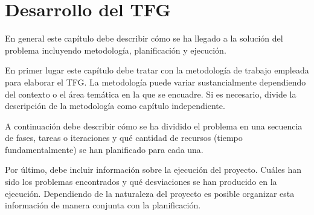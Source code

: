 \chapter{Desarrollo del TFG}
\label{ch:desarrollo}

En general este capítulo debe describir cómo se ha llegado a la solución del problema incluyendo metodología, planificación y ejecución.

En primer lugar este capítulo debe tratar con la metodología de trabajo empleada para elaborar el TFG.  La metodología puede variar sustancialmente dependiendo del contexto o el área temática en la que se encuadre.  Si es necesario, divide la descripción de la metodología como capítulo independiente.

A continuación debe describir cómo se ha dividido el problema en una secuencia de fases, tareas o iteraciones y qué cantidad de recursos (tiempo fundamentalmente) se han planificado para cada una.

Por último, debe incluir información sobre la ejecución del proyecto. Cuáles han sido los problemas encontrados y qué desviaciones se han producido en la ejecución.  Dependiendo de la naturaleza del proyecto es posible organizar esta información de manera conjunta con la planificación.
